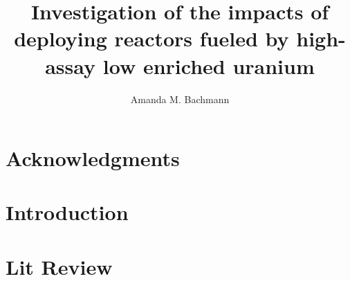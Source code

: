 \documentclass[edeposit,fullpage]{uiucthesis2018}
\title{Investigation of the impacts of deploying reactors fueled by high-assay low enriched uranium}
\author{Amanda M. Bachmann}
\begin{document}
\maketitle

\frontmatter
\begin{abstract}



\end{abstract}

\chapter*{Acknowledgments}




\tableofcontents
\listoftables
\listoffigures


\pagebreak
\mainmatter

\chapter{Introduction} \label{ch:intro}


\chapter{Lit Review} \label{ch:background}

\end{document}
